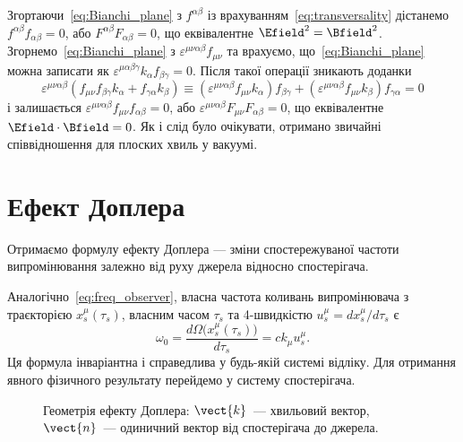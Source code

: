 Згортаючи~\eqref{eq:Bianchi_plane} з $f^{\alpha\beta}$ із врахуванням~\eqref{eq:transversality} дістанемо
$f^{\alpha\beta}f_{\alpha\beta}=0$, або $F^{\alpha\beta}F_{\alpha\beta}=0$, що еквівалентне $\Efield^2=\Bfield^2$.
Згорнемо~\eqref{eq:Bianchi_plane} з $\varepsilon^{\mu\nu\alpha\beta}f_{\mu\nu}$ та врахуємо, що~\eqref{eq:Bianchi_plane}
можна записати як $\varepsilon^{\mu\alpha\beta\gamma}k_{\alpha}f_{\beta\gamma}=0$. Після такої операції зникають доданки
\begin{equation*}
    \varepsilon^{\mu\nu\alpha\beta}(f_{\mu\nu}f_{\beta\gamma}k_{\alpha}
    + f_{\gamma\alpha}k_{\beta})
    \equiv (\varepsilon^{\mu\nu\alpha\beta}f_{\mu\nu}k_{\alpha})f_{\beta\gamma}
    + (\varepsilon^{\mu\nu\alpha\beta}f_{\mu\nu}k_{\beta})f_{\gamma\alpha} = 0
\end{equation*}
і залишається $\varepsilon^{\mu\nu\alpha\beta}f_{\mu\nu}f_{\alpha\beta}=0$, або
$\varepsilon^{\mu\nu\alpha\beta}F_{\mu\nu}F_{\alpha\beta}=0$, що еквівалентне $\Efield\cdot\Bfield=0$. Як і слід було
очікувати, отримано звичайні співвідношення для плоских хвиль у вакуумі.

\section{Ефект Доплера}

Отримаємо формулу ефекту Доплера --- зміни спостережуваної частоти
випромінювання залежно від руху джерела відносно спостерігача.

Аналогічно~\eqref{eq:freq_observer}, власна частота коливань
випромінювача з траєкторією $x_s^{\mu}(\tau_s)$, власним часом
$\tau_s$ та 4-швидкістю $u_s^{\mu} = dx_s^{\mu}/d\tau_s$ є
%
\begin{equation}
    \omega_0 = \frac{d\Omega\bigl(x_s^{\mu}(\tau_s)\bigr)}{d\tau_s}
    = c k_{\mu} u_s^{\mu}.
\end{equation}
%
Ця формула інваріантна і справедлива у будь-якій системі відліку.
Для отримання явного фізичного результату перейдемо у систему
спостерігача.


\begin{figure}[h]
    \centering
    \caption{Геометрія ефекту Доплера: $\vect{k}$~--- хвильовий
        вектор, $\vect{n}$~--- одиничний вектор від спостерігача до
        джерела.}
    \label{fig:doppler}
\end{figure}

